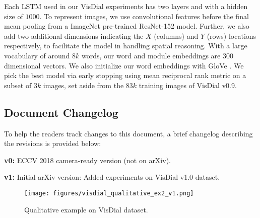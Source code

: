 \documentclass[runningheads]{llncs}
\begin{document}
Each LSTM used in our VisDial experiments has two layers and with a hidden size
of $1000$.
To represent images, we use convolutional features before the final mean pooling
from a ImageNet pre-trained ResNet-152 \cite{he16cvpr} model.
Further, we also add two additional dimensions indicating the $X$ (columns) and 
$Y$ (rows) locations respectively, to facilitate the model in handling
spatial reasoning.
With a large vocabulary of around $8k$ words, our word and module embeddings 
are $300$ dimensional vectors.
We also initialize our word embeddings with GloVe \cite{pennington2014glove}.
We pick the best model via early stopping using mean
reciprocal rank metric on a subset of $3k$ images, set aside from the
$83k$ training images of VisDial v0.9.

\subsection{Document Changelog}
To help the readers track changes to this document, a brief changelog 
describing the revisions is provided below:

\begin{description}
\item{\textbf{v0:}} ECCV 2018 camera-ready version (not on arXiv).
\item{\textbf{v1:}} Initial arXiv version: Added experiments on VisDial v1.0 dataset.
\end{description}
\vspace*{-10pt} 
\begin{figure}
	\centering
    \texttt{[image: figures/visdial\_qualitative\_ex2\_v1.png]}
    \caption{
    Qualitative example on VisDial dataset.}
    \label{fig:visdial_qual_2}
\end{figure} 
\small


\end{document}
